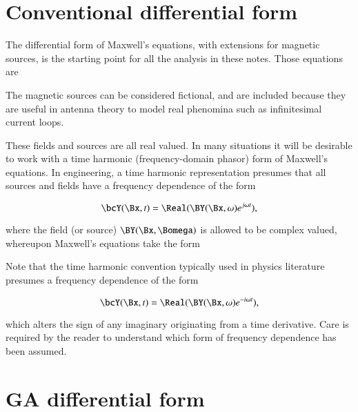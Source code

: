 %
%
\section{Conventional differential form}

The differential form of Maxwell's equations, with extensions for magnetic sources, is the starting point for all the analysis in these notes.  Those equations are



The magnetic sources can be considered fictional, and are included because they are useful in antenna theory to model real phenomina such as infinitesimal current loops.



These fields and sources are all real valued.  In many situations it will be desirable to work with a time harmonic (frequency-domain phasor) form of Maxwell's equations.  In engineering, a time harmonic representation presumes that all sources and fields have a frequency dependence of the form

\begin{dmath}\label{eqn:maxwellsEquations:20}
\bcY(\Bx, t) = \Real( \BY(\Bx, \omega) e^{j\omega t} ),
\end{dmath}

where the field (or source) \( \BY(\Bx, \Bomega) \) is allowed to be complex valued, whereupon Maxwell's equations take the form



Note that the time harmonic convention typically used in physics literature presumes a frequency dependence of the form

\begin{dmath}\label{eqn:maxwellsEquations:40}
\bcY(\Bx, t) = \Real( \BY(\Bx, \omega) e^{-i\omega t} ),
\end{dmath}

which alters the sign of any imaginary originating from a time derivative.  Care is required by the reader to understand which form of frequency dependence has been assumed.

\section{GA differential form}

